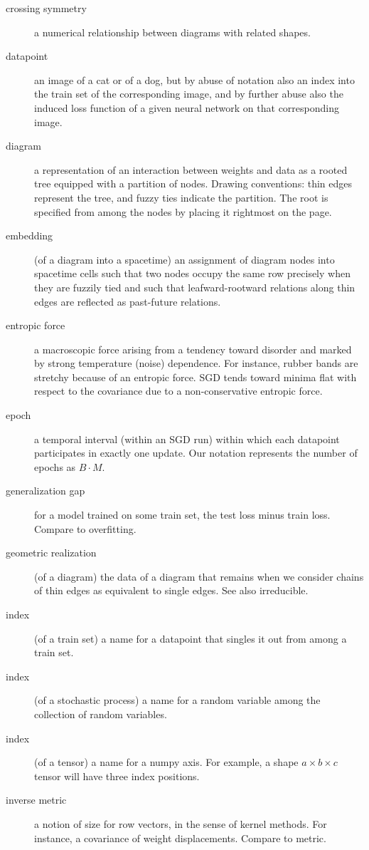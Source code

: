 \documentclass{article}
\theoremstyle{plain}
\theoremstyle{definition}
\begin{document}
\begin{description}
        \item[crossing symmetry] a numerical relationship between diagrams with related shapes. 
        \item[datapoint] an image of a cat or of a dog, but by abuse of notation also an index into the train set of the corresponding image, and by further abuse also the induced loss function of a given neural network on that corresponding image.  
        \item[diagram] a representation of an interaction between weights and data as a rooted tree equipped with a partition of nodes.  Drawing conventions: thin edges represent the tree, and fuzzy ties indicate the partition.  The root is specified from among the nodes by placing it rightmost on the page.
        \item[embedding] (of a diagram into a spacetime) an assignment of diagram nodes into spacetime cells such that two nodes occupy the same row precisely when they are fuzzily tied and such that leafward-rootward relations along thin edges are reflected as past-future relations.
        \item[entropic force] a macroscopic force arising from a tendency toward disorder and marked by strong temperature (noise) dependence.  For instance, rubber bands are stretchy because of an entropic force.  SGD tends toward minima flat with respect to the covariance due to a non-conservative entropic force.    
        \item[epoch] a temporal interval (within an SGD run) within which each datapoint participates in exactly one update.  Our notation represents the number of epochs as $B\cdot M$.
        \item[generalization gap] for a model trained on some train set, the test loss minus train loss.  Compare to overfitting.
        \item[geometric realization] (of a diagram) the data of a diagram that remains when we consider chains of thin edges as equivalent to single edges.  See also irreducible.
        \item[index] (of a train set) a name for a datapoint that singles it out from among a train set.
        \item[index] (of a stochastic process) a name for a random variable among the collection of random variables.
        \item[index] (of a tensor) a name for a numpy axis.  For example, a shape $a\times b\times c$ tensor will have three index positions. 
        \item[inverse metric] a notion of size for row vectors, in the sense of kernel methods.  For instance, a covariance of weight displacements.  Compare to metric.

\end{description}
\end{document}
